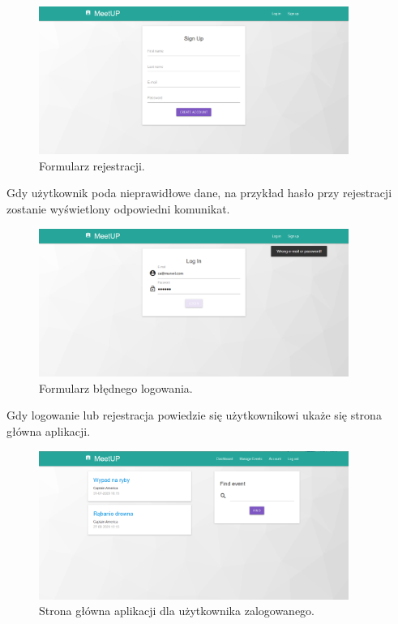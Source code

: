 \documentclass[12pt]{article}
\begin{document}
\begin{figure}[H]
\centering
\includegraphics[width=0.9\textwidth]{meetup_signup.png}
\caption{Formularz rejestracji.}
\end{figure}

Gdy użytkownik poda nieprawidłowe dane, na przykład hasło przy rejestracji zostanie wyświetlony odpowiedni komunikat.

\begin{figure}[H]
\centering
\includegraphics[width=0.9\textwidth]{meetup_login_error.png}
\caption{Formularz błędnego logowania.}
\end{figure}

Gdy logowanie lub rejestracja powiedzie się użytkownikowi ukaże się strona główna aplikacji.

\begin{figure}[H]
\centering
\includegraphics[width=0.9\textwidth]{meetup_dashboard.png}
\caption{Strona główna aplikacji dla użytkownika zalogowanego.}
\end{figure}
\end{document}
